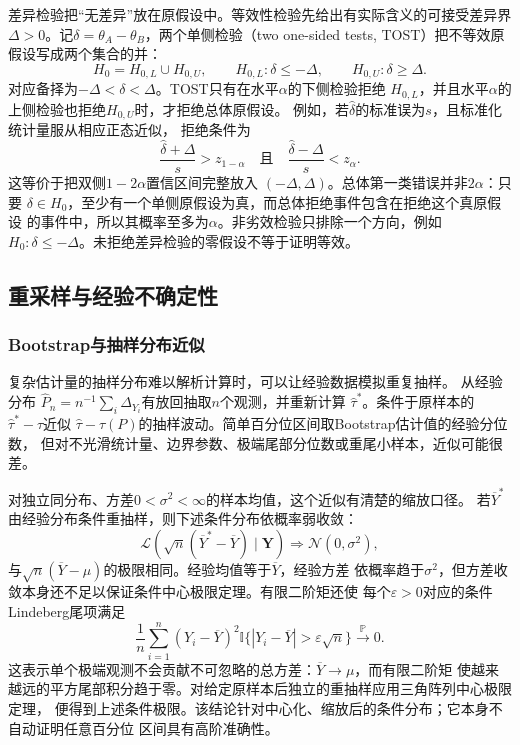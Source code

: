 差异检验把“无差异”放在原假设中。等效性检验先给出有实际含义的可接受差异界
\(\Delta>0\)。记\(\delta=\theta_A-\theta_B\)，两个单侧检验（two one-sided
tests, TOST）把不等效原假设写成两个集合的并：
\[
  H_0=H_{0,L}\cup H_{0,U},
  \qquad
  H_{0,L}:\delta\leq-\Delta,
  \qquad
  H_{0,U}:\delta\geq\Delta.
\]
对应备择为\(-\Delta<\delta<\Delta\)。TOST只有在水平\(\alpha\)的下侧检验拒绝
\(H_{0,L}\)，并且水平\(\alpha\)的上侧检验也拒绝\(H_{0,U}\)时，才拒绝总体原假设。
例如，若\(\widehat\delta\)的标准误为\(s\)，且标准化统计量服从相应正态近似，
拒绝条件为
\begin{equation}
  \frac{\widehat\delta+\Delta}{s}>z_{1-\alpha}
  \quad\text{且}\quad
  \frac{\widehat\delta-\Delta}{s}<z_{\alpha}.
  \label{eq:statistics-tost-rejection}
\end{equation}
这等价于把双侧\(1-2\alpha\)置信区间完整放入
\((-\Delta,\Delta)\)。总体第一类错误并非\(2\alpha\)：只要
\(\delta\in H_0\)，至少有一个单侧原假设为真，而总体拒绝事件包含在拒绝这个真原假设
的事件中，所以其概率至多为\(\alpha\)。非劣效检验只排除一个方向，例如
\(H_0:\delta\leq-\Delta\)。未拒绝差异检验的零假设不等于证明等效。

\subsection{重采样与经验不确定性}
\label{sec:statistics-resampling}

\subsubsection{Bootstrap与抽样分布近似}

复杂估计量的抽样分布难以解析计算时，可以让经验数据模拟重复抽样。
从经验分布
\(\widehat P_n=n^{-1}\sum_i\Delta_{Y_i}\)有放回抽取\(n\)个观测，并重新计算
\(\widehat\tau^\ast\)。条件于原样本的
\(\widehat\tau^\ast-\widehat\tau\)近似
\(\widehat\tau-\tau(P)\)的抽样波动。简单百分位区间取Bootstrap估计值的经验分位数，
但对不光滑统计量、边界参数、极端尾部分位数或重尾小样本，近似可能很差。

对独立同分布、方差\(0<\sigma^2<\infty\)的样本均值，这个近似有清楚的缩放口径。
若\(\overline Y^\ast\)由经验分布条件重抽样，则下述条件分布依概率弱收敛：
\[
  \mathcal L\!\left(
    \sqrt n(\overline Y^\ast-\overline Y)\mid\bm Y
  \right)
  \Longrightarrow\mathcal N(0,\sigma^2),
\]
与\(\sqrt n(\overline Y-\mu)\)的极限相同。经验均值等于\(\overline Y\)，经验方差
依概率趋于\(\sigma^2\)，但方差收敛本身还不足以保证条件中心极限定理。有限二阶矩还使
每个\(\varepsilon>0\)对应的条件Lindeberg尾项满足
\[
  \frac1n\sum_{i=1}^n(Y_i-\overline Y)^2
  \mathbb I\{|Y_i-\overline Y|>\varepsilon\sqrt n\}
  \xrightarrow{\mathbb P}0.
\]
这表示单个极端观测不会贡献不可忽略的总方差：\(\overline Y\to\mu\)，而有限二阶矩
使越来越远的平方尾部积分趋于零。对给定原样本后独立的重抽样应用三角阵列中心极限定理，
便得到上述条件极限。该结论针对中心化、缩放后的条件分布；它本身不自动证明任意百分位
区间具有高阶准确性。

